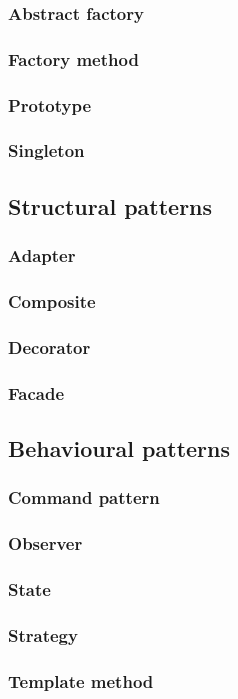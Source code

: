 \subsubsection{Abstract factory}
\subsubsection{Factory method}
\subsubsection{Prototype}
\subsubsection{Singleton}


\subsection{Structural patterns}

\subsubsection{Adapter}
\subsubsection{Composite}
\subsubsection{Decorator}
\subsubsection{Facade}

\subsection{Behavioural patterns}

\subsubsection{Command pattern}
\subsubsection{Observer}
\subsubsection{State}
\subsubsection{Strategy}
\subsubsection{Template method}

